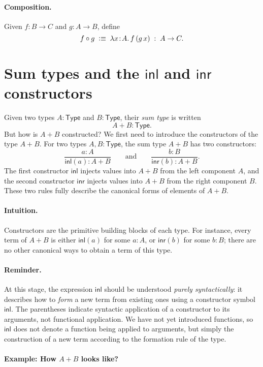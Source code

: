 \documentclass{article}
\newcommand{\Type}{\ensuremath{\mathsf{Type}}}
\newcommand{\defeq}{\vcentcolon\equiv}
\newcommand{\inl}{\mathsf{inl}}
\newcommand{\inr}{\mathsf{inr}}
\begin{document}
\paragraph{Composition.}
Given \(f:B\to C\) and \(g:A\to B\), define
\[
f \circ g \;\defeq\; \lambda x\!:\!A.\, f\,(g\,x) \;:\; A \to C.
\]


\section{Sum types and the \texorpdfstring{$\mathsf{inl}$}{inl} and \texorpdfstring{$\mathsf{inr}$}{inr} constructors}

Given two types \(A : \Type\) and \(B : \Type\), their \emph{sum type}
is written
\[
A + B : \Type.
\]
But how is $A + B$ constructed? We first need to introduce the constructors of the type $A+B$. For two types \(A, B : \Type\), the sum type \(A + B\) has two constructors:
\[
\frac{a : A}{\inl(a) : A + B}
\qquad\text{and}\qquad
\frac{b : B}{\inr(b) : A + B}.
\]
The first constructor \(\inl\) injects values into $A+B$ from the left component \(A\), and the second constructor \(\inr\) injects values into $A+B$ from the right component \(B\). These two rules fully describe the canonical forms of elements of \(A + B\).

\paragraph{Intuition.}
Constructors are the primitive building blocks of each type.  
For instance, every term of \(A + B\) is either \(\inl(a)\) for some \(a : A\), or \(\inr(b)\) for some \(b : B\); there are no other canonical ways to obtain a term of this type.

\paragraph{Reminder.} At this stage, the expression \(\inl\) should be understood \emph{purely syntactically}: it describes how to \emph{form} a new term from existing ones using a constructor symbol \( \inl \). The parentheses indicate syntactic application of a constructor to its arguments, not functional application. We have not yet introduced functions, so \( \inl \) does not denote a function being applied to arguments, but simply the construction of a new term according to the formation rule of the type.

\paragraph{Example: How \(A + B\) looks like?}
\end{document}
